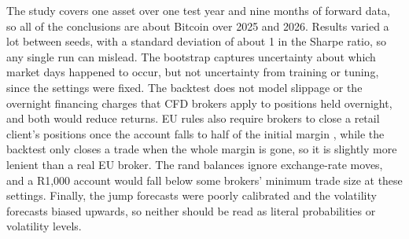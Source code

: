 The study covers one asset over one test year and nine months of forward data, so all of the conclusions are about Bitcoin over 2025 and 2026. Results varied a lot between seeds, with a standard deviation of about 1 in the Sharpe ratio, so any single run can mislead. The bootstrap captures uncertainty about which market days happened to occur, but not uncertainty from training or tuning, since the settings were fixed. The backtest does not model slippage or the overnight financing charges that CFD brokers apply to positions held overnight, and both would reduce returns. EU rules also require brokers to close a retail client's positions once the account falls to half of the initial margin \cite{esma2018}, while the backtest only closes a trade when the whole margin is gone, so it is slightly more lenient than a real EU broker. The rand balances ignore exchange-rate moves, and a R1{,}000 account would fall below some brokers' minimum trade size at these settings. Finally, the jump forecasts were poorly calibrated and the volatility forecasts biased upwards, so neither should be read as literal probabilities or volatility levels.

